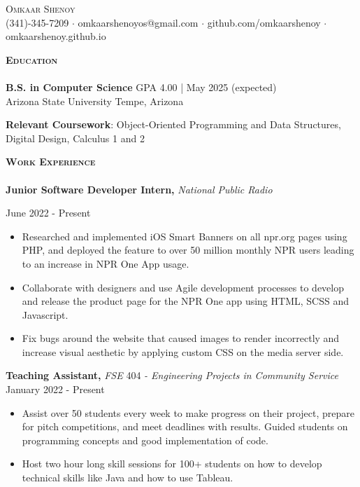\documentclass[10pt, a4paper]{article}
\newcommand{\lineunder} {
    \vspace*{-8pt} \\
    \hspace*{-18pt} \hrulefill \\
}
\newcommand{\header} [1] {
    {\hspace*{-15pt}\vspace*{3pt} \textsc{#1}}
    \vspace*{-6pt} \lineunder
}
\begin{document}
{\begin{center}
    
	{\Huge \scshape {Omkaar Shenoy}}\\
	\vspace{2mm}
	(341)-345-7209 $\cdot$ omkaarshenoyos@gmail.com $\cdot$ github.com/omkaarshenoy  $\cdot$ omkaarshenoy.github.io
	
\end{center}


\vspace{-1mm}
    \header{\textbf{Education}}

    \textbf{B.S. in Computer Science} \hfill GPA 4.00 | May 2025 (expected)
\\ Arizona State University \hfill Tempe, Arizona

\textbf{Relevant Coursework}: Object-Oriented Programming and Data Structures, Digital Design, Calculus 1 and 2 \\


\vspace{2mm}




\vspace{-2mm}
    \header{\textbf{Work Experience}}
    \textbf{Junior Software Developer Intern, } \textit{National Public Radio} }    \hfill June 2022 - Present\\
\vspace{-2mm}
\begin{itemize}
    \itemsep-0.05em
     \item Researched and implemented iOS Smart Banners on all npr.org pages using PHP, and deployed the feature to over 50 million monthly NPR users leading to an increase in NPR One App usage. 
    \item Collaborate with designers and use Agile development processes to develop and release the product page for the NPR One app using HTML, SCSS and Javascript. 
    \item Fix bugs around the website that caused images to render incorrectly and increase visual aesthetic by applying custom CSS on the media server side.

\end{itemize}

    \textbf{Teaching Assistant, } \textit{FSE} 404 \textit{- Engineering Projects in Community Service} \hfill January 2022 - Present\\
    \vspace{-2mm}
    \begin{itemize}
        \itemsep-0.05em
        \item Assist over 50 students every week to make progress on their project, prepare for pitch competitions, and meet deadlines with results. Guided students on programming concepts and good implementation of code.
        \item Host two hour long skill sessions for 100+ students on how to develop technical skills like Java and how to use Tableau.
    \end{itemize}
\end{document}
